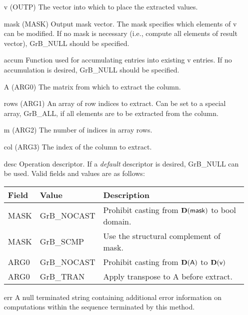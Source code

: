 \begin{itemize}[leftmargin=1in]
    \item[{\sf v}]   ({\sf OUTP}) The vector into which to place the extracted values.

    \item[{\sf mask}] ({\sf MASK}) Output mask vector. The mask
    specifies which elements of {\sf v} can be modified.
    If no mask is necessary (i.e., compute all elements of result
    vector), {\sf GrB\_NULL} should be specified.

    \item[{\sf accum}]  Function used for accumulating entries into existing {\sf v} entries. 
			If no accumulation is desired, {\sf GrB\_NULL} should be specified.

    \item[{\sf A}]   ({\sf ARG0}) The matrix from which to extract the column.

    \item[{\sf rows}]     ({\sf ARG1}) An array of row indices to extract. Can
                              be set to a special array, {\sf GrB\_ALL}, if all elements
                              are to be extracted from the column.
    \item[{\sf m}]     ({\sf ARG2}) The number of indices in array {\sf rows}.
    \item[{\sf col}]     ({\sf ARG3}) The index of the column to extract.

    \item[{\sf desc}]   Operation descriptor. If a
    \emph{default} descriptor is desired, {\sf GrB\_NULL} can be
    used.  Valid fields and values are as follows: \\
    \begin{tabular}{lll}
    Field  & Value & Description \\
    \hline
    {\sf MASK} & {\sf GrB\_NOCAST} & Prohibit casting from $\bold{D}({\sf mask})$ to {\sf bool} domain. \\
    {\sf MASK} & {\sf GrB\_SCMP} & Use the structural complement of {\sf mask}. \\
    {\sf ARG0} & {\sf GrB\_NOCAST} & Prohibit casting from $\bold{D}({\sf A})$ to $\bold{D}({\sf v})$ \\
    {\sf ARG0} & {\sf GrB\_TRAN} & Apply transpose to {\sf A} before extract. \\
    \end{tabular}
    \item[{\sf err}]     A null terminated string containing additional error
                         information on computations within the sequence 
                         terminated by this method. 

\end{itemize}

